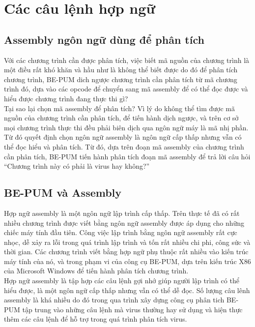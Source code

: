 
\section{Các câu lệnh hợp ngữ}
  \subsection{Assembly ngôn ngữ dùng để phân tích }
  Với các chương trình cần được phân tích, việc biết mã nguồn của chương trình là một điều rất khó khăn và hầu như là không thể biết được do đó để phân tích chương trình, BE-PUM dich ngược chương trình cần phân tích từ mã chương trình đó, dựa vào các opcode để chuyển sang mã assembly để có thể đọc được và hiểu được chương trình đang thực thi gì?\\

Tại sao lại chọn mã assembly để phân tích? Vì lý do không thể tìm được mã nguồn của chương trình cần phân tích, để tiến hành dịch ngược, và trên cơ sở mọi chương trình thực thi đều phải biên dịch qua ngôn ngữ máy là mã nhị phần. Từ đó quyết định chọn ngôn ngữ assembly là ngôn ngữ cấp thấp nhưng vẫn có thể đọc hiểu và phân tích. Từ đó, dựa trên đoạn mã assembly của chương trình cần phân tích, BE-PUM tiến hành phân tích đoạn mã assembly để trả lời câu hỏi “Chương trình này có phải là virus hay không?”\\

  \subsection{BE-PUM và Assembly}
  Hợp ngữ assembly là một ngôn ngữ lập trình cấp thấp. Trên thực tế đã có rất nhiều chương trình được viết bằng ngôn ngữ assembly được áp dụng cho những chiếc máy tính đầu tiên. Công việc lập trình bằng ngôn ngữ assembly rất cực nhọc, dễ xảy ra lỗi trong quá trình lập trình và tốn rất nhiều chi phi, công sức và thời gian. Các chương trình viết bằng hợp ngữ phụ thuộc rất nhiều vào kiến trúc máy tính của nó, và trong phạm vi của công cụ BE-PUM, dựa trên kiến trúc X86 của Microsoft Windows để tiến hành phân tích chương trình.\\

Hợp ngữ assembly là tập hợp các câu lệnh gợi nhớ giúp người lập trình có thể hiểu được, là một ngôn ngữ cấp thấp nhưng vẫn có thể dễ đọc. Số lượng câu lênh assembly là khá nhiều do đó trong qua trình xây dựng công cụ phân tich BE-PUM tập trung vào những câu lệnh mà virus thường hay sử dụng và hiện thực thêm các câu lệnh để hỗ trợ trong quá trình phân tích virus.\\

